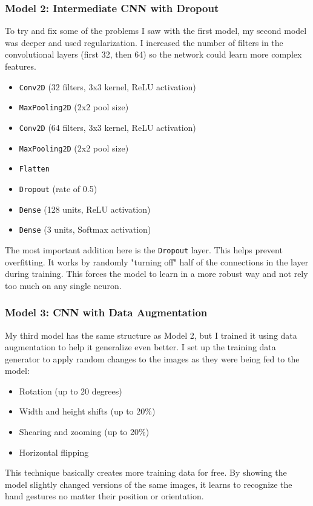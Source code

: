 \documentclass[pdflatex,sn-mathphys-num]{sn-jnl}%
\theoremstyle{thmstyleone}%
\theoremstyle{thmstyletwo}%
\theoremstyle{thmstylethree}%
\begin{document}
\subsubsection{Model 2: Intermediate CNN with Dropout}
To try and fix some of the problems I saw with the first model, my second model was deeper and used regularization. I increased the number of filters in the convolutional layers (first 32, then 64) so the network could learn more complex features.
\begin{itemize}
    \item \texttt{Conv2D} (32 filters, 3x3 kernel, ReLU activation)
    \item \texttt{MaxPooling2D} (2x2 pool size)
    \item \texttt{Conv2D} (64 filters, 3x3 kernel, ReLU activation)
    \item \texttt{MaxPooling2D} (2x2 pool size)
    \item \texttt{Flatten}
    \item \texttt{Dropout} (rate of 0.5)
    \item \texttt{Dense} (128 units, ReLU activation)
    \item \texttt{Dense} (3 units, Softmax activation)
\end{itemize}
The most important addition here is the \texttt{Dropout} layer. This helps prevent overfitting. It works by randomly "turning off" half of the connections in the layer during training. This forces the model to learn in a more robust way and not rely too much on any single neuron.

\subsubsection{Model 3: CNN with Data Augmentation}
My third model has the same structure as Model 2, but I trained it using data augmentation to help it generalize even better. I set up the training data generator to apply random changes to the images as they were being fed to the model:
\begin{itemize}
    \item Rotation (up to 20 degrees)
    \item Width and height shifts (up to 20\%)
    \item Shearing and zooming (up to 20\%)
    \item Horizontal flipping
\end{itemize}
This technique basically creates more training data for free. By showing the model slightly changed versions of the same images, it learns to recognize the hand gestures no matter their position or orientation.
\end{document}
